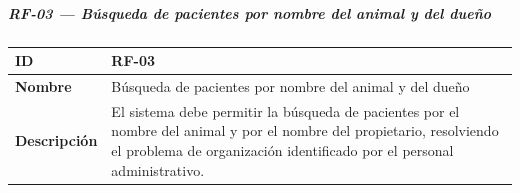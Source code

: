 \subparagraph{RF-03 --- Búsqueda de pacientes por nombre del animal y
del
dueño}\label{rf-03-buxfasqueda-de-pacientes-por-nombre-del-animal-y-del-dueuxf1o}

{\def\LTcaptype{none} %
\begin{longtable}[]{@{}
  >{\raggedright\arraybackslash}p{}
  >{\raggedright\arraybackslash}p{}@{}}
\toprule\noalign{}
\begin{minipage}[b]{\linewidth}\raggedright
\textbf{ID}
\end{minipage} & \begin{minipage}[b]{\linewidth}\raggedright
RF-03
\end{minipage} \\
\midrule\noalign{}
\endhead
\bottomrule\noalign{}
\endlastfoot
\textbf{Nombre} & \begin{minipage}[t]{\linewidth}\raggedright
Búsqueda de pacientes por nombre del animal y del dueño
\end{minipage} \\
\textbf{Descripción} & \begin{minipage}[t]{\linewidth}\raggedright
El sistema debe permitir la búsqueda de pacientes por el nombre del
animal y por el nombre del propietario, resolviendo el problema de
organización identificado por el personal administrativo.
\end{minipage} \\
\end{longtable}
}

